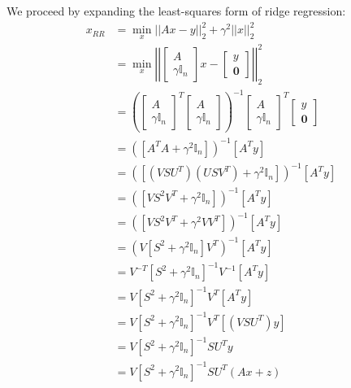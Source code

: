 \documentclass[paper=a4, fontsize=11pt]{scrartcl} %
\numberwithin{equation}{section} %
\numberwithin{figure}{section} %
\numberwithin{table}{section} %
\begin{document}
We proceed by expanding the least-squares form of ridge regression:
\begin{align*}
x_{RR} &= \min_x ||Ax - y||_2^2 + \gamma^2 ||x||_2^2 \\
   &=\min_x \left|\left| \left[ \begin{matrix}A\\ \gamma \mathbb{I}_n \end{matrix} \right] x - \left[ \begin{matrix}y\\ \bm{0} \end{matrix} \right] \right|\right|_2^2 \\
   &= \left( \left[ \begin{matrix}A\\ \gamma \mathbb{I}_n \end{matrix} \right]^T  \left[ \begin{matrix}A\\ \gamma \mathbb{I}_n \end{matrix} \right] \right)^{-1}  \left[ \begin{matrix}A\\ \gamma \mathbb{I}_n \end{matrix} \right] ^T \left[ \begin{matrix}y\\ \bm{0} \end{matrix} \right]\\
   &= \left( \left[A^TA + \gamma^2\mathbb{I}_n\right]\right)^{-1} \left[A^Ty\right] \\
   &= \left(\left[(VSU^T)(USV^T) + \gamma^2 \mathbb{I}_n\right]\right)^{-1}\left[A^Ty\right]  \\
   &= \left(\left[VS^2V^T + \gamma^2 \mathbb{I}_n\right]\right)^{-1}\left[A^Ty\right] \\
   &= \left(\left[VS^2V^T + \gamma^2 VV^T\right]\right)^{-1}\left[A^Ty\right] \\
   &= \left( V \left[S^2 + \gamma^2 \mathbb{I}_n\right] V^T\right)^{-1} \left[A^Ty\right] \\
   &= V^{-T} \left[S^2 + \gamma^2 \mathbb{I}_n\right]^{-1} V^{-1} \left[A^Ty\right] \\
   &= V \left[S^2 + \gamma^2 \mathbb{I}_n\right]^{-1} V^{T} \left[A^Ty\right] \\
   &= V \left[S^2 + \gamma^2 \mathbb{I}_n\right]^{-1} V^{T} \left[(VSU^T)y\right] \\
   &= V \left[S^2 + \gamma^2 \mathbb{I}_n\right]^{-1} SU^Ty \\
   &= V \left[S^2 + \gamma^2 \mathbb{I}_n\right]^{-1} SU^T(Ax+z) \\

\end{align*}
\end{document}
